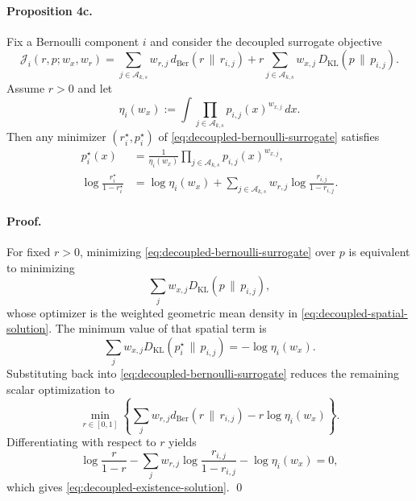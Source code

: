\paragraph{Proposition 4c.}
Fix a Bernoulli component $i$ and consider the decoupled surrogate objective
\begin{equation}
\mathcal{J}_i(r,p;w_x,w_r)
=
\sum_{j \in \mathcal{A}_{k,s}} w_{r,j}\, d_{\mathrm{Ber}}(r\,\|\,r_{i,j})
+
r\sum_{j \in \mathcal{A}_{k,s}} w_{x,j}\, D_{\mathrm{KL}}(p\,\|\,p_{i,j}).
\label{eq:decoupled-bernoulli-surrogate}
\end{equation}
Assume $r>0$ and let
\begin{equation}
\eta_i(w_x) := \int \prod_{j \in \mathcal{A}_{k,s}} p_{i,j}(x)^{w_{x,j}}\,dx.
\end{equation}
Then any minimizer $(r_i^\star,p_i^\star)$ of \eqref{eq:decoupled-bernoulli-surrogate} satisfies
\begin{align}
p_i^\star(x)
&=
\frac{1}{\eta_i(w_x)}
\prod_{j \in \mathcal{A}_{k,s}} p_{i,j}(x)^{w_{x,j}},
\label{eq:decoupled-spatial-solution}
\\
\log\frac{r_i^\star}{1-r_i^\star}
&=
\log \eta_i(w_x)
+
\sum_{j \in \mathcal{A}_{k,s}} w_{r,j}\log\frac{r_{i,j}}{1-r_{i,j}}.
\label{eq:decoupled-existence-solution}
\end{align}

\paragraph{Proof.}
For fixed $r>0$, minimizing \eqref{eq:decoupled-bernoulli-surrogate} over $p$ is equivalent to minimizing
\begin{equation}
\sum_j w_{x,j} D_{\mathrm{KL}}(p\,\|\,p_{i,j}),
\end{equation}
whose optimizer is the weighted geometric mean density in \eqref{eq:decoupled-spatial-solution}. The minimum value of that spatial term is
\begin{equation}
\sum_j w_{x,j} D_{\mathrm{KL}}(p_i^\star\,\|\,p_{i,j}) = -\log \eta_i(w_x).
\end{equation}
Substituting back into \eqref{eq:decoupled-bernoulli-surrogate} reduces the remaining scalar optimization to
\begin{equation}
\min_{r \in [0,1]}
\left\{
\sum_j w_{r,j} d_{\mathrm{Ber}}(r\,\|\,r_{i,j}) - r \log \eta_i(w_x)
\right\}.
\end{equation}
Differentiating with respect to $r$ yields
\begin{equation}
\log\frac{r}{1-r}
- \sum_j w_{r,j}\log\frac{r_{i,j}}{1-r_{i,j}}
- \log \eta_i(w_x)=0,
\end{equation}
which gives \eqref{eq:decoupled-existence-solution}. \qed

